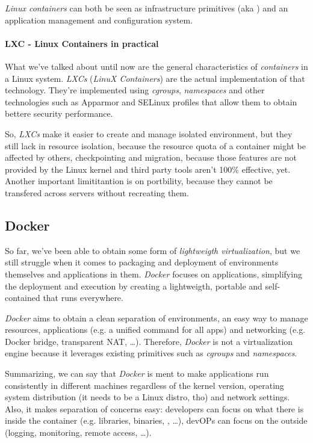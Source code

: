 \begin{note}
    \emph{Linux containers} can both be seen as infrastructure primitives
    (aka ) and an application management and configuration
    system.
\end{note}

\paragraph{LXC - Linux Containers in practical}
What we've talked about until now are the general characteristics of
\emph{containers} in a Linux system. \emph{LXCs} (\emph{LinuX Containers}) are
the actual implementation of that technology. They're implemented using
\emph{cgroups}, \emph{namespaces} and other technologies such as Apparmor and
SELinux profiles that allow them to obtain bettere security performance.

So, \emph{LXCs} make it easier to create and manage isolated environment, but
they still lack in resource isolation, because the resource quota of a container
might be affected by others, checkpointing and migration, because those features
are not provided by the Linux kernel and third party tools aren't 100\% effective,
yet. Another important limititantion is on portbility, because they cannot be
transfered across servers without recreating them.

\subsection{Docker}
So far, we've been able to obtain some form of \emph{lightweigth virtualization},
but we still struggle when it comes to packaging and deployment of environments
themselves and applications in them. \emph{Docker} focuses on applications,
simplifying the deployment and execution by creating a lightweigth, portable
and self-contained  that runs everywhere.

\emph{Docker} aims to obtain a clean separation of environments, an easy
way to manage resources, applications (e.g. a unified  command for all
apps) and networking (e.g. Docker bridge, transparent NAT, \dots). Therefore,
\emph{Docker} is not a virtualization engine because it leverages existing
primitives such as \emph{cgroups} and \emph{namespaces}.

Summarizing, we can say that \emph{Docker} is ment to make applications run
consistently in different machines regardless of the kernel version, operating
system distribution (it needs to be a Linux distro, tho) and network settings.
Also, it makes separation of concerns easy: developers can focus on what there
is inside the container (e.g. libraries, binaries, , \dots), devOPs
can focus on the outside (logging, monitoring, remote access, \dots).

